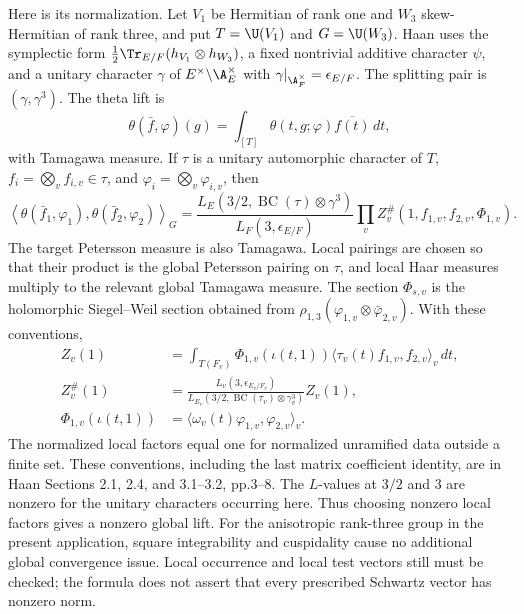 \documentclass[11pt]{article}
\theoremstyle{definition}\newtheorem{definition}[theorem]{Definition}\newtheorem{remark}[theorem]{Remark}
\begin{document}
Here is its normalization. Let $V_1$ be Hermitian of rank one and $W_3$
skew-Hermitian of rank three, and put $T=\U(V_1)$ and $G=\U(W_3)$.
Haan uses the symplectic form
$\frac12\Tr_{E/F}(h_{V_1}\otimes h_{W_3})$, a fixed nontrivial additive
character $\psi$, and a unitary character $\gamma$ of
$E^\times\backslash\A_E^\times$ with
$\gamma|_{\A_F^\times}=\epsilon_{E/F}$. The splitting pair is
$(\gamma,\gamma^3)$. The theta lift is
\[
 \theta(\bar f,\varphi)(g)
 =\int_{[T]}\theta(t,g;\varphi)\overline{f(t)}\,dt,
\]
with Tamagawa measure. If $\tau$ is a unitary automorphic character of
$T$, $f_i=\bigotimes_v f_{i,v}\in\tau$, and
$\varphi_i=\bigotimes_v\varphi_{i,v}$, then
\begin{equation}\label{A-Rallis}
 \left\langle\theta(\bar f_1,\varphi_1),
                    \theta(\bar f_2,\varphi_2)\right\rangle_G
 =\frac{L_E(3/2,\operatorname{BC}(\tau)\otimes\gamma^3)}
        {L_F(3,\epsilon_{E/F})}
       \prod_v Z_v^{\#}(1,f_{1,v},f_{2,v},\Phi_{1,v}).
\end{equation}
The target Petersson measure is also Tamagawa. Local pairings are
chosen so that their product is the global Petersson pairing on
$\tau$, and local Haar measures multiply to the relevant global
Tamagawa measure. The section $\Phi_{s,v}$ is the holomorphic
Siegel--Weil section obtained from
$\rho_{1,3}(\varphi_{1,v}\otimes\bar\varphi_{2,v})$. With these
conventions,
\[
\begin{split}
 Z_v(1)&=\int_{T(F_v)}\Phi_{1,v}(\iota(t,1))
               \langle\tau_v(t)f_{1,v},f_{2,v}\rangle_v\,dt,\\
 Z_v^{\#}(1)&=
 \frac{L_v(3,\epsilon_{E_v/F_v})}
 {L_{E_v}(3/2,\operatorname{BC}(\tau_v)\otimes\gamma_v^3)}Z_v(1),\\
 \Phi_{1,v}(\iota(t,1))&=
       \langle\omega_v(t)\varphi_{1,v},\varphi_{2,v}\rangle_v.
\end{split}
\]
The normalized local factors equal one for normalized unramified data
outside a finite set. These conventions, including the last matrix
coefficient identity, are in Haan Sections 2.1, 2.4, and 3.1--3.2,
pp.3--8. The $L$-values at $3/2$ and $3$ are nonzero for the unitary
characters occurring here. Thus choosing nonzero local factors gives a
nonzero global lift. For the anisotropic rank-three group in the present
application, square integrability and cuspidality cause no additional
global convergence issue. Local occurrence and local test vectors still
must be checked; the formula does not assert that every prescribed
Schwartz vector has nonzero norm.
\end{document}
